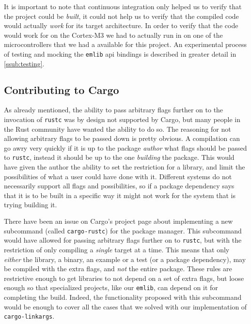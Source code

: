 It is important to note that continuous integration only helped us to verify that the project could be \emph{built}, it could not help us to verify that the compiled code would actually \emph{work} for its target architecture.
In order to verify that the code would work for on the Cortex-M3 we had to actually run in on one of the microcontrollers that we had a available for this project.
An experimental process of testing and mocking the \texttt{emlib} \gls{api} bindings is described in greater detail in \autoref{ssub:testing}.

\subsection{Contributing to Cargo}
\label{ssub:contributing_to_cargo}

As already mentioned, the ability to pass arbitrary flags further on to the invocation of \texttt{rustc} was by design not supported by Cargo, but many people in the Rust community have wanted the ability to do so.
The reasoning for not allowing arbitrary flags to be passed down is pretty obvious.
A compilation can go awry very quickly if it is up to the package \emph{author} what flags should be passed to \texttt{rustc}, instead it should be up to the one \emph{building} the package.
This would have given the author the ability to set the restriction for a library, and limit the possibilities of what a user could have done with it.
Different systems do not necessarily support all flags and possibilities, so if a package dependency says that it is to be built in a specific way it might not work for the system that is trying building it.

There have been an issue on Cargo's project page about implementing a new subcommand (called \texttt{cargo-rustc}) for the package manager.
This subcommand would have allowed for passing arbitrary flags further on to \texttt{rustc}, but with the restriction of only compiling a \emph{single} target at a time.
This means that only \emph{either} the library, a binary, an example or a test (or a package dependency), may be compiled with the extra flags, and \emph{not} the entire package.
These rules are restrictive enough to get libraries to not depend on a set of extra flags, but loose enough so that specialized projects, like our \texttt{emlib}, can depend on it for completing the build.
Indeed, the functionality proposed with this subcommand would be enough to cover all the cases that we solved with our implementation of \texttt{cargo-linkargs}.

